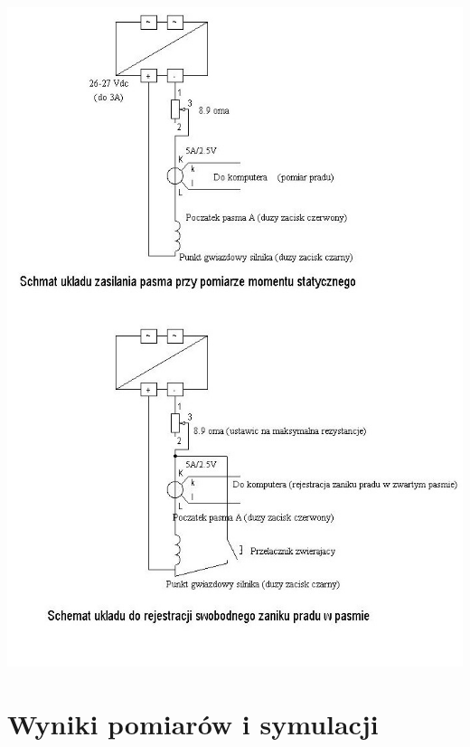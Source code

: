 \documentclass[12pt]{article}
\begin{document}
\begin{center}
	\includegraphics[width=\linewidth]{../res/img/schematy2.jpg}
\end{center}

\newpage

\section{Wyniki pomiarów i symulacji}
\end{document}
